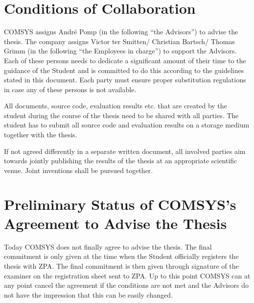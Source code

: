 \documentclass[noaccount,foldmarks,list,nomfg,english,nodate]{style/comsys-letter}
\def\thesisType{Master}
\def\advisorsCompany{Victor ter Smitten/ Christian Bartsch/ Thomas Grimm}
\def\advisorsComsys{André Pomp} %
\def\hisHer{his/her}
\def\doDoes{do/does}
\def\comsysPluralS{(s)}
\def\companyPluralS{(s)}
\def\hisHer{his}
\def\hisHer{her}
\def\doDoes{does}
\def\comsysPluralS{}
\def\doDoes{does}
\def\comsysPluralS{}
\def\doDoes{do}
\def\comsysPluralS{s}
\def\companyPluralS{}
\def\companyPluralS{}
\def\companyPluralS{s}
\begin{document}
%

\section{Conditions of Collaboration}

COMSYS assigns \advisorsComsys{} (in the following ``the Advisor\comsysPluralS{}'') to advise the thesis.
The company assigns \advisorsCompany{} (in the following ``the Employee\companyPluralS{} in charge'') to support the Advisor\comsysPluralS{}.
Each of these persons needs to dedicate a significant amount of their time to the guidance of the Student and is committed to do this according to the guidelines stated in this document.
Each party must ensure proper substitution regulations in case any of these persons is not available.

All documents, source code, evaluation results etc. that are created by the student during the course of the thesis need to be shared with all parties.
The student has to submit all source code and evaluation results on a storage medium together with the thesis.

If not agreed differently in a separate written document, all involved parties aim towards jointly publishing the results of the thesis at an appropriate scientific venue.
Joint inventions shall be pursued together.


\section{Preliminary Status of COMSYS's Agreement to Advise the Thesis}

Today COMSYS does not finally agree to advise the thesis.
The final commitment is only given at the time when the Student officially registers the thesis with ZPA.
The final commitment is then given through signature of the examiner on the registration sheet sent to ZPA.
Up to this point COMSYS can at any point cancel the agreement if the conditions are not met and the Advisor\comsysPluralS{} \doDoes{} not have the impression that this can be easily changed.
\end{document}
